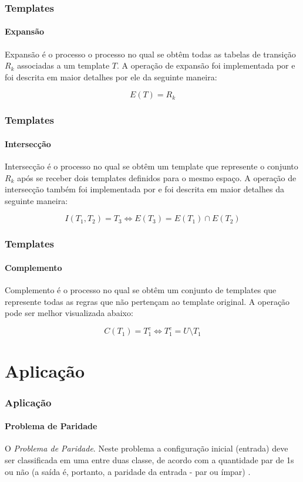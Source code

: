 \documentclass[aspectratio=43]{beamer}
\begin{document}
\begin{frame}
	\frametitle{Templates}
	\framesubtitle{Expansão}

	Expansão é o processo o processo no qual se obtêm todas as tabelas de transição $R_k$ associadas a um template $T$.
	A operação de expansão foi implementada por \cite{daCosta2014} e foi descrita em maior detalhes por ele da seguinte maneira:

	\begin{equation}
	E(T)=R_k
	\end{equation}

 \end{frame}

\begin{frame}
	\frametitle{Templates}
	\framesubtitle{Intersecção}

	Intersecção é o processo no qual se obtêm um template que represente o conjunto $R_k$ após se receber dois templates definidos para o mesmo espaço. A operação de intersecção também foi implementada por \cite{daCosta2014} e foi descrita em maior detalhes da seguinte maneira:

	\begin{equation}
	I(T_1,T_2)=T_3 \Leftrightarrow E(T_3) = E(T_1) \cap E(T_2)
	\end{equation}

 \end{frame}

\begin{frame}
	\frametitle{Templates}
	\framesubtitle{Complemento}

	Complemento é o processo no qual se obtêm um conjunto de templates que represente todas as regras que não pertençam ao template original. A operação pode ser melhor visualizada abaixo:

	\begin{equation}
	C(T_1)=T_1^c \Leftrightarrow T_1^c = U \setminus T_1
	\end{equation}
 \end{frame}

\section{Aplicação}
\begin{frame}
    \frametitle{Aplicação}
    \framesubtitle{Problema de Paridade}
   
    O \textit{Problema de Paridade}. Neste problema a configuração inicial (entrada) deve ser classificada em uma entre duas classe, de acordo com a quantidade par de 1s ou não (a saída é, portanto, a paridade da entrada - par ou ímpar) \cite{Sipper1998}.
\end{frame}
\end{document}

